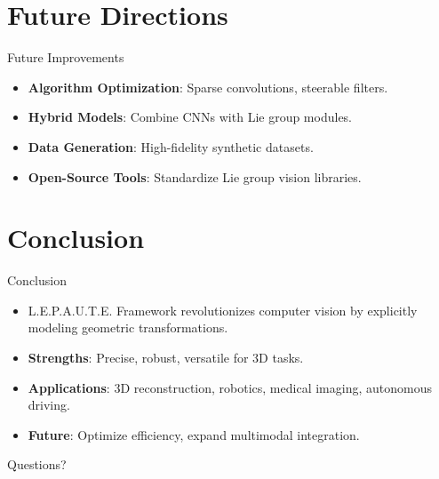 \documentclass{beamer}
\begin{document}
\section{Future Directions}
\begin{frame}{Future Improvements}
  \begin{itemize}
    \item<1-> \textbf{Algorithm Optimization}: Sparse convolutions, steerable filters.
    \item<2-> \textbf{Hybrid Models}: Combine CNNs with Lie group modules.
    \item<3-> \textbf{Data Generation}: High-fidelity synthetic datasets.
    \item<4-> \textbf{Open-Source Tools}: Standardize Lie group vision libraries.
  \end{itemize}
\end{frame}

\section{Conclusion}
\begin{frame}{Conclusion}
  \begin{itemize}
    \item<1-> L.E.P.A.U.T.E. Framework revolutionizes computer vision by explicitly modeling geometric transformations.
    \item<2-> \textbf{Strengths}: Precise, robust, versatile for 3D tasks.
    \item<3-> \textbf{Applications}: 3D reconstruction, robotics, medical imaging, autonomous driving.
    \item<4-> \textbf{Future}: Optimize efficiency, expand multimodal integration.
  \end{itemize}
\end{frame}

\begin{frame}{Questions?}
  \begin{center}
  \end{center}
\end{frame}
\end{document}
